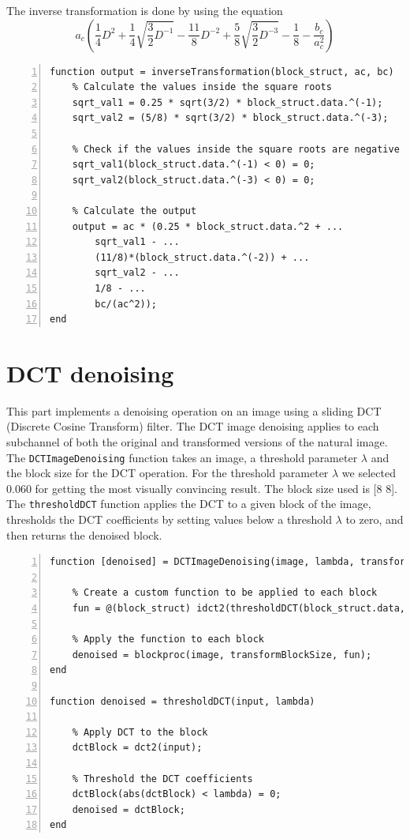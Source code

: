 \documentclass[12pt,a4paper,english
]{tunithesis}
\begin{document}
The inverse transformation is done by using the equation
\[
a_c \left( \frac{1}{4} D^2 + \frac{1}{4}\sqrt{\frac{3}{2}D^{-1}} - \frac{11}{8}D^{-2} + \frac{5}{8}\sqrt{\frac{3}{2}D^{-3}} - \frac{1}{8} - \frac{b_c}{a_c^2} \right)
\]
\begin{lstlisting}[style=Matlab-editor, numbers=left, basicstyle=\small]
% % 9. Inverse transformation
function output = inverseTransformation(block_struct, ac, bc)
    % Calculate the values inside the square roots
    sqrt_val1 = 0.25 * sqrt(3/2) * block_struct.data.^(-1);
    sqrt_val2 = (5/8) * sqrt(3/2) * block_struct.data.^(-3);

    % Check if the values inside the square roots are negative
    sqrt_val1(block_struct.data.^(-1) < 0) = 0;
    sqrt_val2(block_struct.data.^(-3) < 0) = 0;

    % Calculate the output
    output = ac * (0.25 * block_struct.data.^2 + ...
        sqrt_val1 - ...
        (11/8)*(block_struct.data.^(-2)) + ...
        sqrt_val2 - ...
        1/8 - ...
        bc/(ac^2));
end
\end{lstlisting}

\section{DCT denoising}
This part implements a denoising operation on an image using a sliding DCT (Discrete Cosine Transform) filter. The DCT image denoising applies to each subchannel of both the original and transformed versions of the natural image. The \texttt{DCTImageDenoising} function takes an image, a threshold parameter $\lambda$ and the block size for the DCT operation. For the threshold parameter $\lambda$ we selected 0.060 for getting the most visually convincing result. The block size used is [8 8]. The \texttt{thresholdDCT} function applies the DCT to a given block of the image, thresholds the DCT coefficients by setting values below a threshold $\lambda$ to zero, and then returns the denoised block.

\begin{lstlisting}[style=Matlab-editor, numbers=left, basicstyle=\small]
function [denoised] = DCTImageDenoising(image, lambda, transformBlockSize)

    % Create a custom function to be applied to each block
    fun = @(block_struct) idct2(thresholdDCT(block_struct.data, lambda));

    % Apply the function to each block
    denoised = blockproc(image, transformBlockSize, fun);
end

function denoised = thresholdDCT(input, lambda)

    % Apply DCT to the block
    dctBlock = dct2(input);

    % Threshold the DCT coefficients
    dctBlock(abs(dctBlock) < lambda) = 0;
    denoised = dctBlock;
end
\end{lstlisting}
\end{document}
